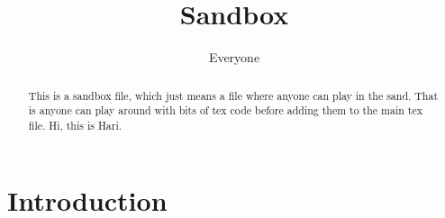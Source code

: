 \documentclass{article}
\title{Sandbox}
\author{Everyone}
\begin{document}
\maketitle

\begin{abstract}
    This is a sandbox file, which just means a file where anyone can play in the sand. That is anyone can play around with bits of tex code before adding them to the main tex file. Hi, this is Hari.
\end{abstract}

\section{Introduction}
\end{document}
